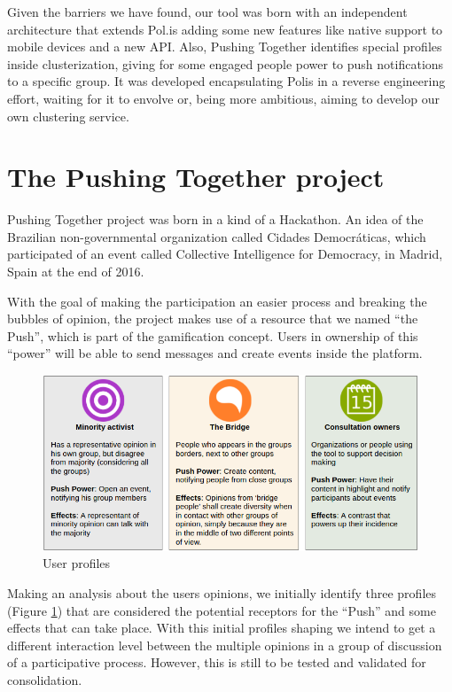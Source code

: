 \documentclass{llncs}
\begin{document}
  Given the barriers we have found, our tool was born with an independent
architecture that extends Pol.is adding some new features like native support
to mobile devices and a new API. Also, Pushing Together identifies special
profiles inside clusterization, giving for some engaged people power to
push notifications to a specific group. It was developed encapsulating Polis in
a reverse engineering effort, waiting for it to envolve or, being more ambitious,
aiming to develop our own clustering service.

\section{The Pushing Together project}
\label{sec:pushingtogether}

  Pushing Together project was born in a kind of a Hackathon. An idea of the
Brazilian non-governmental organization called Cidades Democráticas, which
participated of an event called Collective Intelligence for Democracy, in
Madrid, Spain at the end of 2016.

  With the goal of making the participation an easier process and breaking the
bubbles of opinion, the project makes use of a resource that we named ``the
Push'', which is part of the gamification concept. Users in ownership of this
``power'' will be able to send messages and create events inside the platform.

 \begin{figure}[hbt]
   \centering
     \includegraphics[keepaspectratio=true,scale=0.45]{images/userprofiles.png}
   \caption{User profiles}
   \label{fig:userprofiles}
 \end{figure}

  Making an analysis about the users opinions, we initially identify three
profiles (Figure \ref{fig:userprofiles}) that are considered the potential
receptors for the ``Push'' and some effects that can take place. With this
initial profiles shaping we intend to get a different interaction level between
the multiple opinions in a group of discussion of a participative process.
However, this is still to be tested and validated for consolidation.
\end{document}
